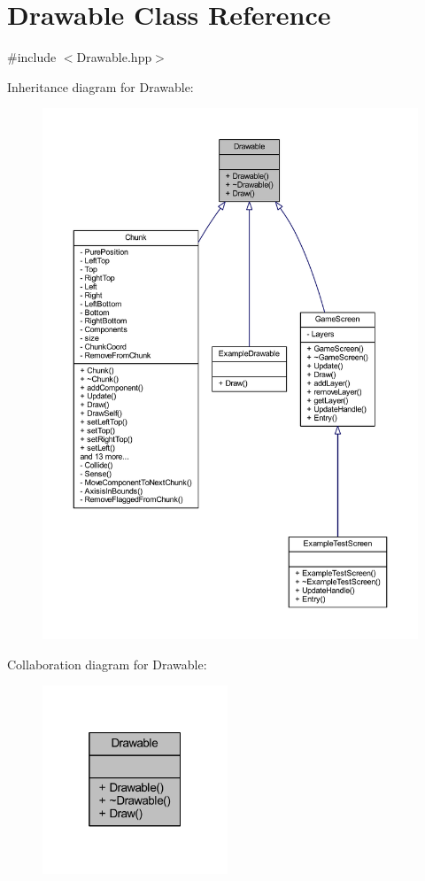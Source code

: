 \hypertarget{class_drawable}{\section{Drawable Class Reference}
\label{class_drawable}
}


{\ttfamily \#include $<$Drawable.\-hpp$>$}



Inheritance diagram for Drawable\-:\nopagebreak
\begin{figure}[H]
\begin{center}
\leavevmode
\includegraphics[width=350pt]{class_drawable__inherit__graph}
\end{center}
\end{figure}


Collaboration diagram for Drawable\-:\nopagebreak
\begin{figure}[H]
\begin{center}
\leavevmode
\includegraphics[width=157pt]{class_drawable__coll__graph}
\end{center}
\end{figure}
